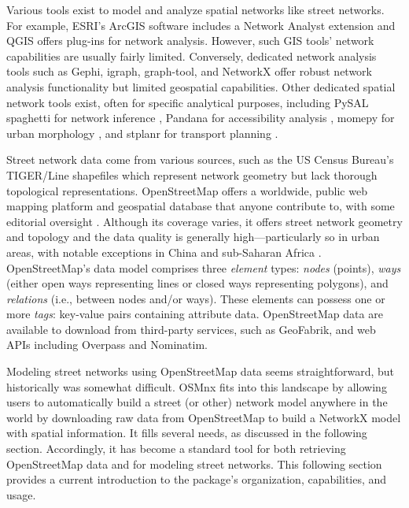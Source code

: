 \documentclass[12pt,letterpaper]{article} %
\begin{document}
Various tools exist to model and analyze spatial networks like street networks. For example, ESRI's ArcGIS software includes a Network Analyst extension and QGIS offers plug-ins for network analysis. However, such GIS tools' network capabilities are usually fairly limited. Conversely, dedicated network analysis tools such as Gephi, igraph, graph-tool, and NetworkX offer robust network analysis functionality but limited geospatial capabilities. Other dedicated spatial network tools exist, often for specific analytical purposes, including PySAL spaghetti for network inference \citep{gaboardi_spaghetti_2021,rey_pysal_2022}, Pandana for accessibility analysis \citep{foti_behavioral_2014}, momepy for urban morphology \citep{fleischmann_momepy_2019}, and stplanr for transport planning \citep{lovelace_stplanr_2019}.

Street network data come from various sources, such as the US Census Bureau's TIGER/Line shapefiles which represent network geometry but lack thorough topological representations. OpenStreetMap offers a worldwide, public web mapping platform and geospatial database that anyone contribute to, with some editorial oversight \citep{jokar_arsanjani_openstreetmap_2015}. Although its coverage varies, it offers street network geometry and topology and the data quality is generally high---particularly so in urban areas, with notable exceptions in China and sub-Saharan Africa \citep{barron_comprehensive_2014,barrington-leigh_worlds_2017}. OpenStreetMap's data model comprises three \textit{element} types: \textit{nodes} (points), \textit{ways} (either open ways representing lines or closed ways representing polygons), and \textit{relations} (i.e., between nodes and/or ways). These elements can possess one or more \textit{tags}: key-value pairs containing attribute data. OpenStreetMap data are available to download from third-party services, such as GeoFabrik, and web APIs including Overpass and Nominatim.

Modeling street networks using OpenStreetMap data seems straightforward, but historically was somewhat difficult. OSMnx fits into this landscape by allowing users to automatically build a street (or other) network model anywhere in the world by downloading raw data from OpenStreetMap to build a NetworkX model with spatial information. It fills several needs, as discussed in the following section. Accordingly, it has become a standard tool for both retrieving OpenStreetMap data and for modeling street networks. This following section provides a current introduction to the package's organization, capabilities, and usage.
\end{document}
